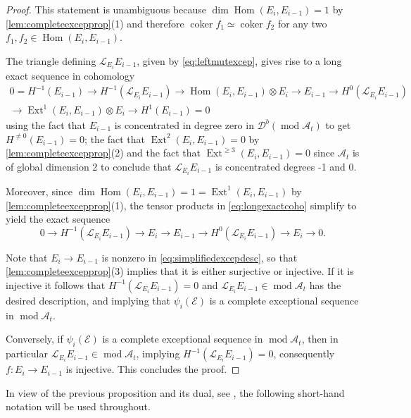 \documentclass[10pt,twoside, a4paper,reqno]{amsart}
\DeclareMathOperator{\mods}{mod}
\DeclareMathOperator{\Ext}{Ext}
\DeclareMathOperator{\Hom}{Hom}
\DeclareMathOperator{\coker}{coker}
\newcommand{\A}{\mathscr{A}}
\newcommand{\Dcal}{\mathcal{D}}
\newcommand{\Ecal}{\mathcal{E}}
\newcommand{\Lcal}{\mathcal{L}}
\theoremstyle{definition}
\begin{document}
\begin{proof}
    This statement is unambiguous because $\dim \Hom(E_{i}, E_{i-1})=1$ by \cref{lem:completeexcepprop}(1) and therefore $\coker f_1 \simeq \coker f_2$ for any two $f_1, f_2 \in \Hom(E_i, E_{i-1})$. 

    The triangle defining $\Lcal_{E_i} E_{i-1}$, given by \cref{eq:leftmutexcep}, gives rise to a long exact sequence in cohomology
    \begin{equation}\begin{aligned}\label{eq:longexactcoho} 0 = H^{-1}(E_{i-1}) \to H^{-1}(\Lcal_{E_i} E_{i-1}) \to \Hom(E_i, E_{i-1})\otimes E_i \to E_{i-1} \to H^0(\Lcal_{E_i} E_{i-1}) \\
    \to \Ext^1(E_i, E_{i-1}) \otimes E_i \to H^1(E_{i-1}) = 0
    \end{aligned}\end{equation}
    using the fact that $E_{i-1}$ is concentrated in degree zero in $\Dcal^b(\mods \A_t)$ to get $H^{\neq 0}(E_{i-1})= 0$; the fact that $\Ext^2(E_i, E_{i-1})= 0$ by \cref{lem:completeexcepprop}(2) and the fact that $\Ext^{\geq 3}(E_i, E_{i-1}) = 0$ since $\A_t$ is of global dimension 2 to conclude that $\Lcal_{E_i} E_{i-1}$ is concentrated degrees -1 and 0. 

    Moreover, since $\dim \Hom(E_i, E_{i-1})=1 = \Ext^1(E_i, E_{i-1})$ by \cref{lem:completeexcepprop}(1), the tensor products in \cref{eq:longexactcoho} simplify to yield the exact sequence
    \begin{equation}\label{eq:simplifiedexcepdesc} 0 \to H^{-1}(\Lcal_{E_i} E_{i-1}) \to E_i \to E_{i-1} \to H^0(\Lcal_{E_i} E_{i-1}) \to E_i \to 0. \end{equation}

    Note that $E_i \to E_{i-1}$ is nonzero in \cref{eq:simplifiedexcepdesc}, so that \cref{lem:completeexcepprop}(3) implies that it is either surjective or injective. If it is injective it follows that $H^{-1}(\Lcal_{E_i} E_{i-1})=0$ and $\Lcal_{E_i} E_{i-1} \in \mods \A_t$ has the desired description, and implying that $\psi_i(\Ecal)$ is a complete exceptional sequence in $\mods \A_t$. 

    Conversely, if $\psi_i(\Ecal)$ is a complete exceptional sequence in $\mods \A_t$, then in particular $\Lcal_{E_i} E_{i-1} \in \mods \A_t$, implying $H^{-1}(\Lcal_{E_i} E_{i-1}) = 0$, consequently $f: E_i \to E_{i-1}$ is injective. This concludes the proof.
\end{proof}

In view of the previous proposition and its dual, see \cite[Lem. 4.7, Cor. 4.8]{HillePloog2019}, the following short-hand notation will be used throughout.
\end{document}
